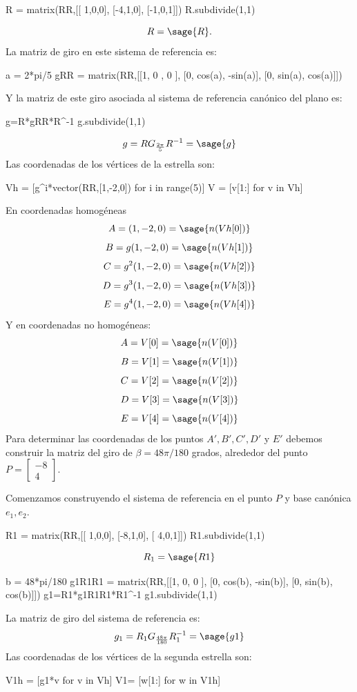 \documentclass{amsart}
\begin{document}
\begin{sageblock}
R = matrix(RR,[[ 1,0,0],
            [-4,1,0],
            [-1,0,1]])
R.subdivide(1,1)
\end{sageblock}
$$R=\sage{R}.$$
La matriz de giro en este sistema de referencia es:
\begin{sageblock}
a = 2*pi/5
gRR = matrix(RR,[[1, 0     ,  0   ],
            		[0, cos(a), -sin(a)],
            		[0, sin(a),  cos(a)]])
\end{sageblock}
Y la matriz de este giro asociada al sistema de referencia canónico del plano es:
\begin{sageblock}
g=R*gRR*R^-1
g.subdivide(1,1)
\end{sageblock}
\[ g=RG_{\frac{2\pi}{5}}R^{-1} = \sage{g} \] 
Las coordenadas de los vértices de la estrella son:
\begin{sageblock}
Vh = [g^i*vector(RR,[1,-2,0]) for i in range(5)]
V = [v[1:] for v in Vh]
\end{sageblock}
En coordenadas homogéneas
$$A = (1,-2,0)=  \sage{n(Vh[0])} $$
$$B  =  g(1,-2,0)= \sage{n(Vh[1])} $$
$$C  = g^2(1,-2,0)=  \sage{n(Vh[2])} $$
$$D  = g^3(1,-2,0)= \sage{n(Vh[3])} $$
$$E  = g^4(1,-2,0)= \sage{n(Vh[4])} $$
Y en coordenadas no homogéneas:
$$A  = V[0] =  \sage{n(V[0])} $$
$$B  = V[1]=  \sage{n(V[1])} $$
$$C  = V[2]= \sage{n(V[2])} $$
$$D  = V[3]= \sage{n(V[3])} $$
$$E  = V[4]= \sage{n(V[4])} $$
Para determinar las coordenadas de los puntos $A',B',C',D'$ y $E'$ debemos construir la matriz del giro de $\beta = 48\pi/180$ grados, alrededor del punto $P = \left[\begin{array}{r} -8 \\ 4 \end{array} \right] $. 

Comenzamos construyendo el sistema de referencia en el punto $P$ y base canónica $e_1,e_2$.
\begin{sageblock}
R1 = matrix(RR,[[ 1,0,0],
             [-8,1,0],
             [ 4,0,1]])
R1.subdivide(1,1)
\end{sageblock}  
$$R_1=\sage{R1}$$
\begin{sageblock}           
b = 48*pi/180
g1R1R1 = matrix(RR,[[1, 0,       0 ],
             [0, cos(b), -sin(b)],
             [0, sin(b),  cos(b)]])
g1=R1*g1R1R1*R1^-1
g1.subdivide(1,1)
\end{sageblock}
La matriz de giro del sistema de referencia es:
$$g_1=R_1G_{\frac{48\pi}{180}}R_1^{-1}=\sage{g1}$$
Las coordenadas de los vértices de la segunda estrella son:
\begin{sageblock}
V1h = [g1*v for v in Vh]
V1= [w[1:] for w in V1h]
\end{sageblock}
\end{document}

